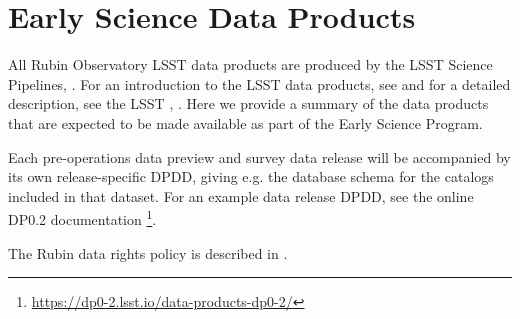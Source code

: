 \section{Early Science Data Products}
\label{sec:data}

All Rubin Observatory LSST data products are produced by the LSST Science Pipelines, \cite{2019ASPC..523..521B,2018PASJ...70S...5B}.
For an introduction to the LSST data products, see \citet{RubinDataProductsAbridged} and for a detailed description, see the LSST \dpdd,  \citet{LSE-163}.
Here we provide a summary of the data products that are expected to be made available as part of the Early Science Program.

Each pre-operations data preview and survey data release will be accompanied by its own release-specific DPDD, giving e.g. the  database schema for the catalogs included in that dataset.
For an example data release DPDD, see the online DP0.2 documentation \footnote{\url{https://dp0-2.lsst.io/data-products-dp0-2/}}.

The Rubin data rights policy is described in  \cite{RDO-013}.

